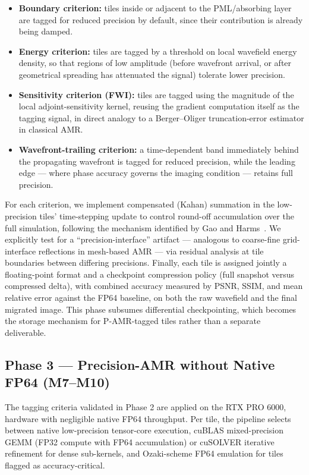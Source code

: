 \documentclass[12pt,a4paper]{article}
\newcommand{\pamr}{P\nobreakdash-AMR}
\begin{document}
\begin{itemize}
  \item \textbf{Boundary criterion:} tiles inside or adjacent to the
        PML/absorbing layer are tagged for reduced precision by default, since
        their contribution is already being damped.
  \item \textbf{Energy criterion:} tiles are tagged by a threshold on local
        wavefield energy density, so that regions of low amplitude (before
        wavefront arrival, or after geometrical spreading has attenuated the
        signal) tolerate lower precision.
  \item \textbf{Sensitivity criterion (FWI):} tiles are tagged using the
        magnitude of the local adjoint-sensitivity kernel, reusing the gradient
        computation itself as the tagging signal, in direct analogy to a
        Berger--Oliger truncation-error estimator in classical AMR.
  \item \textbf{Wavefront-trailing criterion:} a time-dependent band immediately
        behind the propagating wavefront is tagged for reduced precision, while
        the leading edge --- where phase accuracy governs the imaging condition
        --- retains full precision.
\end{itemize}

For each criterion, we implement compensated (Kahan) summation in the
low-precision tiles' time-stepping update to control round-off accumulation over
the full simulation, following the mechanism identified by Gao and
Harms~\cite{gao2023half}. We explicitly test for a ``precision-interface''
artifact --- analogous to coarse-fine grid-interface reflections in mesh-based
AMR --- via residual analysis at tile boundaries between differing precisions.
Finally, each tile is assigned jointly a floating-point format and a checkpoint
compression policy (full snapshot versus compressed delta), with combined
accuracy measured by PSNR, SSIM, and mean relative error against the FP64
baseline, on both the raw wavefield and the final migrated image. This phase
subsumes differential checkpointing, which becomes the storage mechanism for
\pamr{}-tagged tiles rather than a separate deliverable.

\subsection{Phase 3 --- Precision-AMR without Native FP64 (M7--M10)}

The tagging criteria validated in Phase 2 are applied on the RTX PRO 6000,
hardware with negligible native FP64 throughput. Per tile, the pipeline selects
between native low-precision tensor-core execution, cuBLAS mixed-precision GEMM
(FP32 compute with FP64 accumulation) or cuSOLVER iterative refinement for dense
sub-kernels, and Ozaki-scheme FP64 emulation for tiles flagged as
accuracy-critical.
\end{document}
